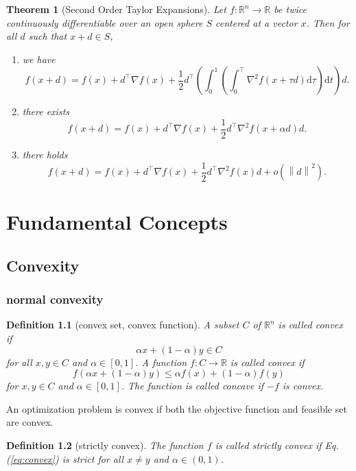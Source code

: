 \documentclass[12pt,a4paper]{report}
\numberwithin{equation}{section}
\theoremstyle{mystyle}
\newtheorem{definition}{Definition}[section]
\newtheorem{theorem}[definition]{Theorem}
\newcommand{\R}{\mathbb{R}}
\newcommand{\grad}{\nabla}
\renewcommand{\d}{\mathrm{d}}
\newcommand{\T}{\top}
\newcommand{\norm}[1]{\left\lVert #1 \right\rVert}
\begin{document}
	\begin{theorem}[Second Order Taylor Expansions]
		Let $f:\R^n \to \R$ be twice continuously differentiable over an open sphere $S$ centered at a vector $x$. Then for all $d$ such that $x+d\in S$,
		\begin{enumerate}
			\item we have
			$$
			f(x+d)=f(x)+d^\T \grad f(x) +\frac{1}{2}d^\T\left(\int_0^1\left(\int_0^\T \grad^2 f(x+\tau d)\d \tau\right)\d t\right)d.
			$$
			\item there exists
			$$
			f(x+d)=f(x)+d^\T \grad f(x)+\frac{1}{2}d^\T \grad^2 f(x+\alpha d)d.
			$$
			\item there holds
			$$
			f(x+d)=f(x)+d^\T \grad f(x)+\frac{1}{2}d^\T \grad^2 f(x)d+o(\norm{d}^2).
			$$
		\end{enumerate}
	\end{theorem}

	
	
	
	
	
	\chapter{Fundamental Concepts}
	\section{Convexity}
	\subsection{normal convexity}
	\begin{definition}[convex set, convex function]
		A subset $C$ of $\R^n$ is called \emph{convex} if 
		$$
		\alpha x+(1-\alpha)y\in C
		$$ for all $x,y\in C$ and $\alpha\in [0,1]$. A function $f:C\to \R$ is called \emph{convex} if 
		\begin{equation}
			f(\alpha x+(1-\alpha )y)\leq 
			\alpha f(x)+(1-\alpha)f(y)\label{eq:convex}
		\end{equation}
		for $x,y\in C$ and $\alpha\in [0,1]$. The function is called \emph{concave} if $-f$ is convex.
	\end{definition}
	
	An optimization problem is convex if both the objective function and feasible set are convex.

	\begin{definition}[strictly convex]
		The function $f$ is called \emph{strictly convex} if Eq.(\ref{eq:convex}) is strict for all $x\neq y$ and $\alpha\in(0,1)$.
	\end{definition}
\end{document}
